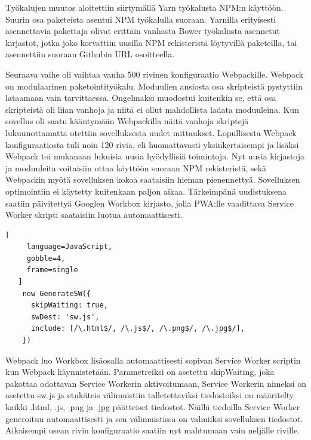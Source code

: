 \documentclass{tktltiki}
\begin{document}
Työkalujen muutos aloitettiin siirtymällä Yarn työkalusta NPM:n käyttöön. Suurin osa paketeista asentui NPM työkalulla suoraan. Yarnilla erityisesti asennettavia pakettaja olivat erittäin vanhasta Bower työkalusta asennetut kirjastot, jotka joko korvattiin uusilla NPM rekisteristä löytyvillä paketeilla, tai asennettiin suoraan Githubin URL osoitteella. 

Seuraava vaihe oli vaihtaa vanha 500 rivinen konfiguraatio Webpackille. Webpack on modulaarinen paketointityökalu. Moduulien ansiosta osa skripteistä pystyttiin lataamaan vain tarvittaessa. Ongelmaksi muodostui kuitenkin se, että osa skripteistä oli liian vanhoja ja niitä ei ollut mahdollista ladata moduuleina. Kun sovellus oli saatu kääntymään Webpackilla näitä vanhoja skriptejä lukuunottamatta otettiin sovelluksesta uudet mittaukset. Lopullisesta Webpack konfiguraatiosta tuli noin 120 riviä, eli huomattavasti yksinkertaisempi ja lisäksi Webpack toi mukanaan lukuisia uusia hyödyllisiä toimintoja. Nyt uusia kirjastoja ja moduuleita voitaisiin ottaa käyttöön suoraan NPM rekisteristä, sekä Webpackin myötä sovelluksen kokoa saataisiin hieman pienennettyä. Sovelluksen optimointiin ei käytetty kuitenkaan paljon aikaa. Tärkeimpänä uudistuksena saatiin päivitettyä Googlen Workbox kirjasto, jolla PWA:lle vaadittava Service Worker skripti saataisiin luotua automaattisesti.

\begin{lstlisting}[
     language=JavaScript,
     gobble=4,
     frame=single
   ]
    new GenerateSW({
      skipWaiting: true,
      swDest: 'sw.js',
      include: [/\.html$/, /\.js$/, /\.png$/, /\.jpg$/],
    })
\end{lstlisting}

Webpack luo Workbox lisäosalla automaattisesti sopivan Service Worker scriptin kun Webpack käynnistetään. Parametreiksi on asetettu skipWaiting, joka pakottaa odottavan Service Workerin aktivoitumaan, Service Workerin nimeksi on asetettu sw.js ja etukäteis välimuistiin talletettaviksi tiedostoiksi on määritelty kaikki .html, .js, .png ja .jpg päätteiset tiedostot. Näillä tiedoilla Service Worker generoituu automaattisesti ja sen välimuistissa on valmiiksi sovelluksen tiedostot. Aikaisempi usean rivin konfiguraatio saatiin nyt mahtumaan vain neljälle riville. 
\end{document}
